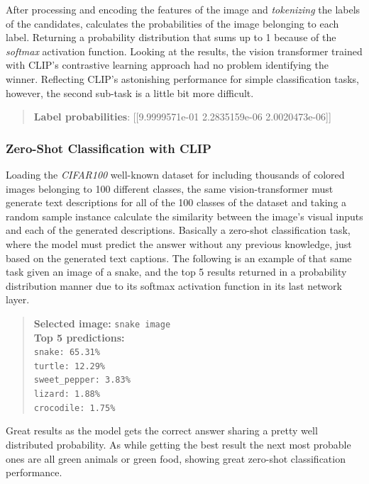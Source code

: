 After processing and encoding the features of the image and \textit{tokenizing} the labels of the candidates, calculates the probabilities of the image belonging to each label. Returning a probability distribution that sums up to 1 because of the \textit{softmax} activation function. Looking at the results, the vision transformer trained with CLIP's contrastive learning approach had no problem identifying the winner. Reflecting CLIP's astonishing performance for simple classification tasks, however, the second sub-task is a little bit more difficult.

\begin{quote}
	\textbf{Label probabilities}: [[9.9999571e-01 2.2835159e-06 2.0020473e-06]]
\end{quote}

\subsubsection{Zero-Shot Classification with CLIP}
Loading the \textit{CIFAR100} well-known dataset for including thousands of colored images belonging to 100 different classes, the same vision-transformer must generate text descriptions for all of the 100 classes of the dataset and taking a random sample instance calculate the similarity between the image's visual inputs and each of the generated descriptions. Basically a zero-shot classification task, where the model must predict the answer without any previous knowledge, just based on the generated text captions. The following is an example of that same task given an image of a snake, and the top 5 results returned in a probability distribution manner due to its softmax activation function in its last network layer.

\begin{quote}
	\textbf{Selected image:} \texttt{snake image} \\
	\textbf{Top 5 predictions:} \\
	\texttt{snake: 65.31\% \\ turtle: 12.29\% \\ sweet\_pepper: 3.83\% \\ lizard: 1.88\% \\ crocodile: 1.75\%}
\end{quote}

Great results  as the model gets the correct answer sharing a pretty well distributed probability. As while getting the best result the next most probable ones are all green animals or green food, showing great zero-shot classification performance.

